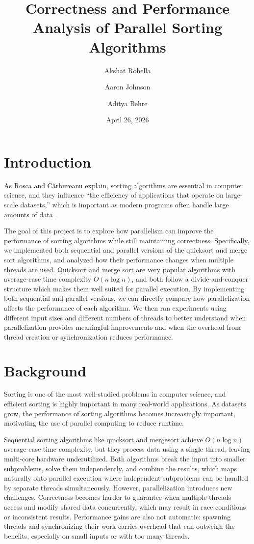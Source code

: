 \documentclass[letterpaper]{article}
\title{Correctness and Performance Analysis of Parallel Sorting Algorithms}
\author{Akshat Rohella \and Aaron Johnson \and Aditya Behre}
\date{April 26, 2026}
\begin{document}
\maketitle

\section{Introduction}
As Rosca and C\u{a}rbureanu explain, sorting algorithms are essential in computer science, and they influence ``the efficiency of applications that operate on large-scale datasets,'' which is important as modern programs often handle large amounts of data \cite{rosca}.

The goal of this project is to explore how parallelism can improve the performance of sorting algorithms while still maintaining correctness. Specifically, we implemented both sequential and parallel versions of the quicksort and merge sort algorithms, and analyzed how their performance changes when multiple threads are used. Quicksort and merge sort are very popular algorithms with average-case time complexity $O(n \log n)$, and both follow a divide-and-conquer structure which makes them well suited for parallel execution. By implementing both sequential and parallel versions, we can directly compare how parallelization affects the performance of each algorithm. We then ran experiments using different input sizes and different numbers of threads to better understand when parallelization provides meaningful improvements and when the overhead from thread creation or synchronization reduces performance.

\section{Background}
Sorting is one of the most well-studied problems in computer science, and efficient sorting is highly important in many real-world applications. As datasets grow, the performance of sorting algorithms becomes increasingly important, motivating the use of parallel computing to reduce runtime.

Sequential sorting algorithms like quicksort and mergesort achieve $O(n \log n)$ average-case time complexity, but they process data using a single thread, leaving multi-core hardware underutilized. Both algorithms break the input into smaller subproblems, solve them independently, and combine the results, which maps naturally onto parallel execution where independent subproblems can be handled by separate threads simultaneously. However, parallelization introduces new challenges. Correctness becomes harder to guarantee when multiple threads access and modify shared data concurrently, which may result in race conditions or inconsistent results. Performance gains are also not automatic: spawning threads and synchronizing their work carries overhead that can outweigh the benefits, especially on small inputs or with too many threads.
\end{document}
